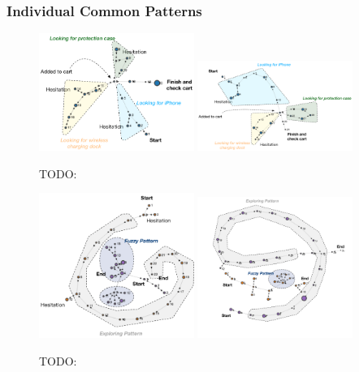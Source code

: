 \subsubsection{Individual Common Patterns}

\begin{figure}[H]
    \centering
    \includegraphics[width=0.45\textwidth]{figures/vis-goal1}
    \includegraphics[width=0.45\textwidth]{figures/vis-goal2}
    \caption{TODO:}
    \label{fig:vis-goal}
\end{figure}


\begin{figure}[H]
    \centering
    \includegraphics[width=0.45\textwidth]{figures/vis-fuzzy-explore1}
    \includegraphics[width=0.45\textwidth]{figures/vis-fuzzy-explore2}
    \caption{TODO:}
    \label{fig:vis-fuzzy-explore}
\end{figure}

